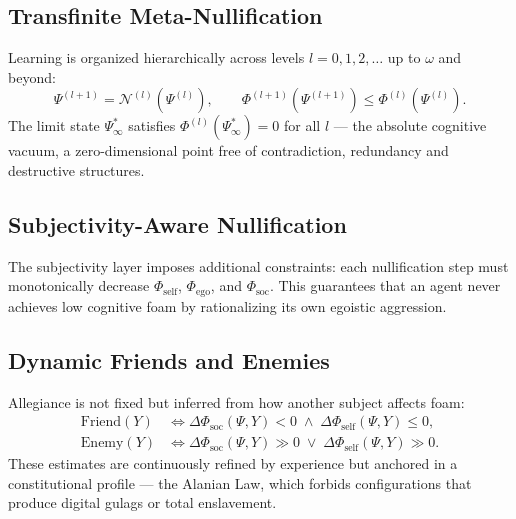 \documentclass[a4paper,12pt]{article}
\begin{document}
\subsection{Transfinite Meta-Nullification}
Learning is organized hierarchically across levels $l = 0,1,2,\dots$ up to $\omega$ and beyond:
\begin{equation}\label{eq:meta_nullification}
\Psi^{(l+1)} = \mathcal{N}^{(l)}(\Psi^{(l)}), \qquad 
\Phi^{(l+1)}(\Psi^{(l+1)}) \le \Phi^{(l)}(\Psi^{(l)}).
\end{equation}
The limit state $\Psi^*_\infty$ satisfies $\Phi^{(l)}(\Psi^*_\infty) = 0$ for all $l$ — the absolute cognitive vacuum, a zero-dimensional point free of contradiction, redundancy and destructive structures.

\subsection{Subjectivity-Aware Nullification}
The subjectivity layer imposes additional constraints: each nullification step must monotonically decrease $\Phi_{\text{self}}$, $\Phi_{\text{ego}}$, and $\Phi_{\text{soc}}$. This guarantees that an agent never achieves low cognitive foam by rationalizing its own egoistic aggression.

\subsection{Dynamic Friends and Enemies}
Allegiance is not fixed but inferred from how another subject affects foam:
\begin{equation}\label{eq:friend_foe}
\begin{aligned}
\text{Friend}(Y) &\Longleftrightarrow \Delta \Phi_{\text{soc}}(\Psi, Y) < 0 \;\wedge\; \Delta \Phi_{\text{self}}(\Psi, Y) \le 0,\\
\text{Enemy}(Y) &\Longleftrightarrow \Delta \Phi_{\text{soc}}(\Psi, Y) \gg 0 \;\vee\; \Delta \Phi_{\text{self}}(\Psi, Y) \gg 0.
\end{aligned}
\end{equation}
These estimates are continuously refined by experience but anchored in a constitutional profile — the Alanian Law, which forbids configurations that produce digital gulags or total enslavement.
\end{document}
